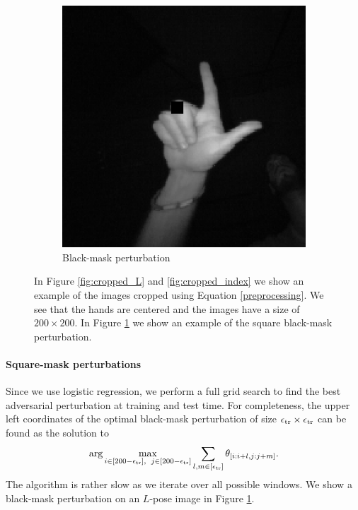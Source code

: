 \begin{figure}[!ht]
\begin{subfigure}{0.31\textwidth}
    \centering
    \includegraphics[width=.80\linewidth]{plotsAistats/L_pose_with_mask.png}
    \caption{Black-mask perturbation}
    \label{fig:cropped_L_mask}
\end{subfigure}
    \caption{In Figure \ref{fig:cropped_L} and \ref{fig:cropped_index} we show an example of the images cropped using Equation \ref{preprocessing}. We see that the hands are centered and the images have a size of $200 \times 200$. In Figure \ref{fig:cropped_L_mask} we show an example of the square black-mask perturbation.}
    \label{fig:preprocessing}
\end{figure}

\paragraph{Square-mask perturbations}
 Since we use logistic regression, we perform a full grid search to find the best adversarial perturbation at training and test time. For completeness, the upper left coordinates of the optimal black-mask perturbation of size $\epsilon_{\text{tr}} \times \epsilon_{\text{tr}}$ can be found as the solution to
\begin{equation}
\label{square_perturbations_logistic_regression}
    \text{arg}\max_{i \in [200-\epsilon_{\text{tr}}], \hspace{0.5em} j \in [200-\epsilon_{\text{tr}}]} \sum_{l,m \in [\epsilon_{\text{tr}}]}\theta_{[i:i+l,j:j+m]}.
\end{equation}
The algorithm is rather slow as we iterate over all possible windows. We show a black-mask perturbation on an $L$-pose image in Figure \ref{fig:cropped_L_mask}.

